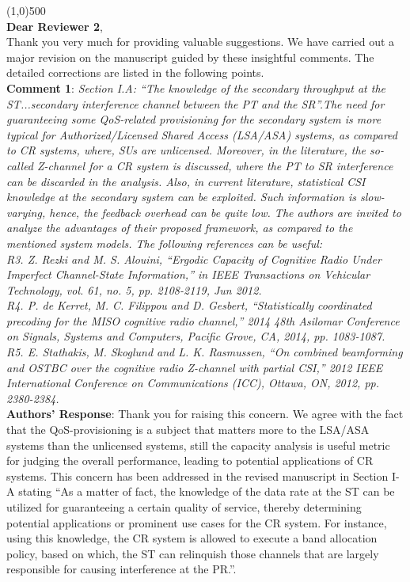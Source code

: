 \documentclass[12pt,a4wide,peerreview]{IEEEtran}
\newcommand{\tc}[1]{#1}
\begin{document}
\line(1,0){500} \\
\textbf{Dear Reviewer 2},\\
Thank you very much for providing valuable suggestions. We have carried out a major revision on the manuscript guided by these insightful comments. The detailed corrections are listed in the following points. \\
\textbf{\tc{Comment 1}}: 
\textit{
Section I.A: ``The knowledge of the secondary throughput at the ST...secondary interference channel between the PT and the SR''.The need for guaranteeing some QoS-related provisioning for the secondary system is more typical for Authorized/Licensed Shared Access (LSA/ASA) systems, as compared to CR systems, where, SUs are unlicensed. Moreover, in the literature, the so-called Z-channel for a CR system is discussed, where the PT to SR interference can be discarded in the analysis. Also, in current literature, statistical CSI knowledge at the secondary system can be exploited. Such information is slow-varying, hence, the feedback overhead can be quite low. The authors are invited to analyze the advantages of their proposed framework, as compared to the mentioned system models. The following references can be useful:
\\
R3. Z. Rezki and M. S. Alouini, ``Ergodic Capacity of Cognitive Radio Under Imperfect Channel-State Information,'' in IEEE Transactions on Vehicular Technology, vol. 61, no. 5, pp. 2108-2119, Jun 2012.
\\
R4. P. de Kerret, M. C. Filippou and D. Gesbert, ``Statistically coordinated precoding for the MISO cognitive radio channel,'' 2014 48th Asilomar Conference on Signals, Systems and Computers, Pacific Grove, CA, 2014, pp. 1083-1087.
\\
R5. E. Stathakis, M. Skoglund and L. K. Rasmussen, ``On combined beamforming and OSTBC over the cognitive radio Z-channel with partial CSI,'' 2012 IEEE International Conference on Communications (ICC), Ottawa, ON, 2012, pp. 2380-2384.
}
\\
\textbf{Authors' Response}:
Thank you for raising this concern. We agree with the fact that the QoS-provisioning is a subject that matters more to the LSA/ASA systems than the unlicensed systems, still the capacity analysis is useful metric for judging the overall performance, leading to potential applications of CR systems. This concern has been addressed in the revised manuscript in Section I-A stating ``As a matter of fact, the knowledge of the data rate at the ST can be utilized for guaranteeing a certain quality of service, thereby determining potential applications or prominent use cases for the CR system. For instance, using this knowledge, the CR system is allowed to execute a band allocation policy, based on which, the ST can relinquish those channels that are largely responsible for causing interference at the PR.''. \\ 
\end{document}
